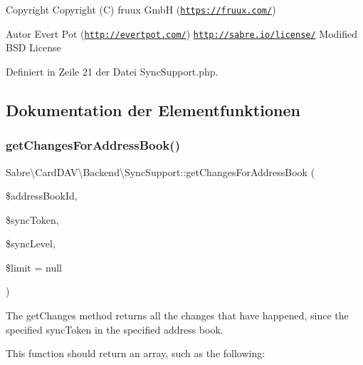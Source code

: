 \begin{DoxyCopyright}{Copyright}
Copyright (C) fruux GmbH (\href{https://fruux.com/}{\tt https\+://fruux.\+com/}) 
\end{DoxyCopyright}
\begin{DoxyAuthor}{Autor}
Evert Pot (\href{http://evertpot.com/}{\tt http\+://evertpot.\+com/})  \href{http://sabre.io/license/}{\tt http\+://sabre.\+io/license/} Modified B\+SD License 
\end{DoxyAuthor}


Definiert in Zeile 21 der Datei Sync\+Support.\+php.



\subsection{Dokumentation der Elementfunktionen}
\mbox{\label{interface_sabre_1_1_card_d_a_v_1_1_backend_1_1_sync_support_a22986a624e847ee914606574686f7dcd}} 
\subsubsection{\texorpdfstring{get\+Changes\+For\+Address\+Book()}{getChangesForAddressBook()}}
{\footnotesize\ttfamily Sabre\textbackslash{}\+Card\+D\+A\+V\textbackslash{}\+Backend\textbackslash{}\+Sync\+Support\+::get\+Changes\+For\+Address\+Book (\begin{DoxyParamCaption}\item[{}]{\$address\+Book\+Id,  }\item[{}]{\$sync\+Token,  }\item[{}]{\$sync\+Level,  }\item[{}]{\$limit = {\ttfamily null} }\end{DoxyParamCaption})}

The get\+Changes method returns all the changes that have happened, since the specified sync\+Token in the specified address book.

This function should return an array, such as the following\+:

